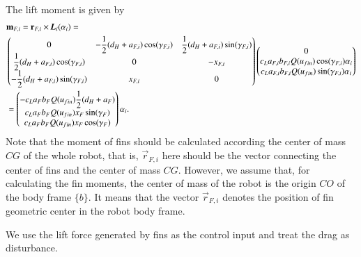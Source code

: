 The lift moment is given by
\begin{align}
&\vec{m}_{F,i}=\vec{r}_{F,i}\times \emph{\textbf{L}}_{i}(\alpha_{i})= \nonumber \\
&\begin{pmatrix}
   0&-\dfrac{1}{2}(d_{H}+a_{F,i})\cos(\gamma_{F,i})&\dfrac{1}{2}(d_{H}+a_{F,i})\sin(\gamma_{F,i})\\
   \dfrac{1}{2}(d_{H}+a_{F,i})\cos(\gamma_{F,i})&0&-x_{F,i}\\
   -\dfrac{1}{2}(d_{H}+a_{F,i})\sin(\gamma_{F,i})&x_{F,i}&0
 \end{pmatrix} 
 \begin{pmatrix}
 0\\c_{L}a_{F,i}b_{F,i}Q(u_{fin})\cos(\gamma_{F,i})\alpha_{i}\\
c_{L}a_{F,i}b_{F,i}Q(u_{fin})\sin(\gamma_{F,i})\alpha_{i}
 \end{pmatrix} \nonumber \\
&=\begin{pmatrix}
-c_{L}a_{F}b_{F}Q(u_{fin})\dfrac{1}{2}(d_{H}+a_{F})\\
c_{L}a_{F}b_{F}Q(u_{fin})x_{F}\sin(\gamma_{F})\\
c_{L}a_{F}b_{F}Q(u_{fin})x_{F}\cos(\gamma_{F})
\end{pmatrix}
\alpha_{i}.
\end{align}
Note that the moment of fins should be calculated according the center of mass $CG$ of the whole robot, that is, $ \vec{r}_{F,i} $ here should be the vector connecting the center of fins and the center of mass $CG$. However, we assume that, for calculating the fin moments, the center of mass of the robot is the origin $CO$ of the body frame $\lbrace b \rbrace$. It means that the vector $\vec{r}_{F,i}$ denotes the position of fin geometric center in the robot body frame.

We use the lift force generated by fins as the control input and treat the drag as disturbance.

